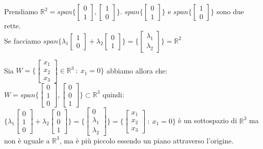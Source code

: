 \begin{example}
Prendiamo $\mathbb{R}^2 = span\Big\{\begin{bmatrix}0\\1\end{bmatrix},\begin{bmatrix}1\\0\end{bmatrix}\Big\}$. $span\Big\{\begin{bmatrix}0\\1\end{bmatrix}\Big\}$ e $span\Big\{\begin{bmatrix}1\\0\end{bmatrix}\Big\}$ sono due rette.\\
Se facciamo $span\Big\{\lambda_1 \begin{bmatrix}1\\0\end{bmatrix} + \lambda_2 \begin{bmatrix}0\\1\end{bmatrix}\Big\} = \Big\{\begin{bmatrix}\lambda_1\\\lambda_2\end{bmatrix}\Big\} = \mathbb{R}^2$
\end{example}

\begin{example}
Sia $W = \Big\{\begin{bmatrix}x_1\\x_2\\x_3\end{bmatrix} \in \mathbb{R}^3 \: : \: x_1 = 0\Big\}$ abbiamo allora che:
$W = span\Big\{\begin{bmatrix}0\\1\\0\end{bmatrix}, \begin{bmatrix}0\\0\\1\end{bmatrix} \Big\} \subset \mathbb{R}^3$ quindi: $\Big \{\lambda_1 \begin{bmatrix}0\\1\\0\end{bmatrix} + \lambda_2 \begin{bmatrix}0\\0\\1\end{bmatrix}\} = \{\begin{bmatrix}0\\\lambda_1 \\ \lambda_2\end{bmatrix}\} = \{\begin{bmatrix}x_1\\x_2\\x_3\end{bmatrix}\: : \: x_1=0\}$ è un sottospazio di $\mathbb{R}^3$ ma non è uguale a $\mathbb{R}^3$, ma è più piccolo essendo un piano attraverso l'origine.
\end{example}

